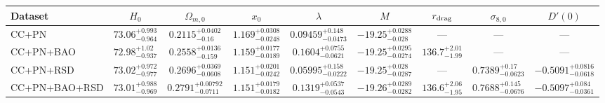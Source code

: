 \begin{tabular}{lcccccccc}
\hline
Dataset & $H_0$ & $\Omega_{m,0}$ & $x_0$ & $\lambda$ & $M$ & $r_{\rm drag}$ & $\sigma_{8,0}$ & $D'(0)$ \\
\hline
CC+PN & $73.06^{+0.993}_{-0.964}$ & $0.2115^{+0.0402}_{-0.16}$ & $1.169^{+0.0308}_{-0.0248}$ & $0.09459^{+0.148}_{-0.0473}$ & $-19.25^{+0.0288}_{-0.028}$ & — & — & — \\
CC+PN+BAO & $72.98^{+1.02}_{-0.937}$ & $0.2558^{+0.0136}_{-0.159}$ & $1.159^{+0.0177}_{-0.0189}$ & $0.1604^{+0.0755}_{-0.0621}$ & $-19.25^{+0.0295}_{-0.0274}$ & $136.7^{+2.01}_{-1.99}$ & — & — \\
CC+PN+RSD & $73.02^{+0.972}_{-0.977}$ & $0.2696^{+0.0369}_{-0.0608}$ & $1.151^{+0.0201}_{-0.0242}$ & $0.05995^{+0.158}_{-0.0222}$ & $-19.25^{+0.028}_{-0.0287}$ & — & $0.7389^{+0.17}_{-0.0623}$ & $-0.5091^{+0.0816}_{-0.0618}$ \\
CC+PN+BAO+RSD & $73.01^{+0.988}_{-0.969}$ & $0.2791^{+0.00792}_{-0.0711}$ & $1.151^{+0.0179}_{-0.0182}$ & $0.1319^{+0.0537}_{-0.0543}$ & $-19.26^{+0.0289}_{-0.0282}$ & $136.6^{+2.06}_{-1.95}$ & $0.7688^{+0.145}_{-0.0676}$ & $-0.5097^{+0.084}_{-0.0361}$ \\
\hline
\end{tabular}
